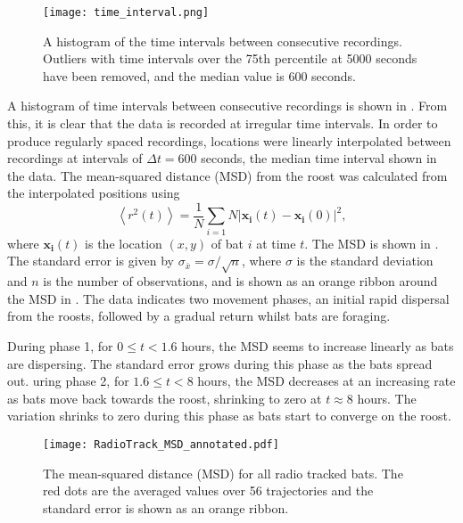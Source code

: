 \begin{figure} [h]
    \centering
        \texttt{[image: time\_interval.png]}
        \caption{A histogram of the time intervals between consecutive recordings. Outliers with time intervals over the 75th percentile at 5000 seconds have been removed, and the median value is 600 seconds.}
    \label{fig:time_interval}
\end{figure}

A histogram of time intervals between consecutive recordings is shown in . From this, it is clear that the data is recorded at irregular time intervals. In order to produce regularly spaced recordings, locations were linearly
interpolated between recordings at intervals of $\Delta t = 600$ seconds, the median time interval shown in the data.
The mean-squared distance (MSD) from the roost was calculated from the
interpolated positions using
%
\begin{equation}
\left<r^2(t)\right> = \frac{1}{N} \sum_{i=1}{N} |\bm{x_i}(t)-\bm{x_i}(0)|^2,
\end{equation}
%
where $\bm{x_i}(t)$ is the location $(x,y)$ of bat $i$ at time $t$. The MSD is shown in . The standard error is given by $\sigma_{\bar{x}} = \sigma/\sqrt{n}$, where
$\sigma$ is the standard deviation and $n$ is the number of observations, and is
shown as an orange ribbon around the MSD in . The data indicates two movement phases, an initial rapid dispersal from the roosts, followed by a gradual return whilst bats are foraging.

During phase 1, for $0 \leq t < 1.6$ hours, the MSD seems to increase linearly as bats are dispersing. The standard error grows during this phase as the bats spread out. uring phase 2, for $1.6 \leq t < 8$ hours, the MSD decreases at an increasing rate as bats move back towards the roost, shrinking to zero at $t \approx 8$ hours. The variation shrinks to zero during this phase as bats start to converge on the roost.
%
\begin{figure} [h]
    \centering
        \texttt{[image: RadioTrack\_MSD\_annotated.pdf]}
        \caption{The mean-squared distance (MSD) for all radio tracked bats.
        The red dots are the averaged values over 56 trajectories and the standard error is shown as an orange ribbon.}
    \label{fig:MSD}
\end{figure}
